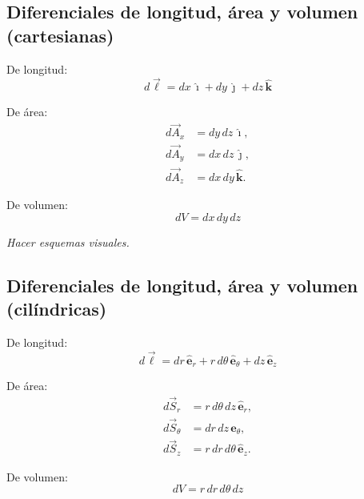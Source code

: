 \documentclass[a4paper,12pt]{article}
\begin{document}
\newpage

\subsection*{Diferenciales de longitud, área y volumen (cartesianas)}

De longitud:
\[
d\vec{\ell} = dx\,\hat{\imath} + dy\,\hat{\jmath} + dz\,\hat{\mathbf k}
\]

De área:
\[
\begin{aligned}
d\vec{A}_x &= dy\,dz\,\hat{\imath},\\
d\vec{A}_y &= dx\,dz\,\hat{\jmath},\\
d\vec{A}_z &= dx\,dy\,\hat{\mathbf k}.
\end{aligned}
\]

De volumen:
\[
dV = dx\,dy\,dz
\]

\textit{Hacer esquemas visuales.}


\subsection*{Diferenciales de longitud, área y volumen (cilíndricas)}

De longitud:
\[
d\vec{\ell} = dr\,\hat{\mathbf e}_r + r\,d\theta\,\hat{\mathbf e}_\theta + dz\,\hat{\mathbf e}_z
\]

De área:
\[
\begin{aligned}
d\vec{S}_r      &= r\,d\theta\,dz\,\hat{\mathbf e}_r,\\
d\vec{S}_\theta &= dr\,dz\,\hat{\mathbf e}_\theta,\\
d\vec{S}_z      &= r\,dr\,d\theta\,\hat{\mathbf e}_z.
\end{aligned}
\]

De volumen:
\[
dV = r\,dr\,d\theta\,dz
\]

\begin{center}
\end{center}
\end{document}
